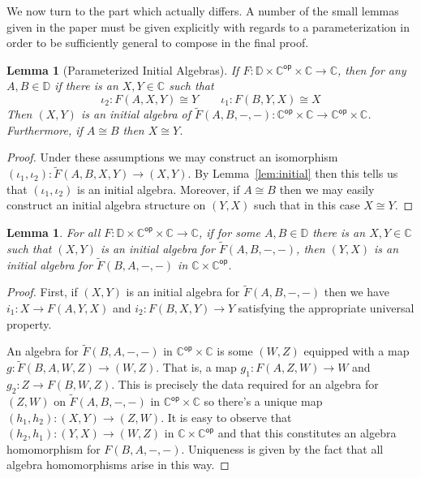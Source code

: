 \documentclass{amsart}
\newtheorem{lem}[thm]{Lemma}
\newcommand{\Ccat}{\ensuremath{\mathbb{C}}}
\newcommand{\Dcat}{\ensuremath{\mathbb{D}}}
\newcommand{\op}[1]{\ensuremath{#1^{\mathsf{op}}}}
\newcommand{\symmetrize}[1]{\ensuremath{\widetilde{#1}}}
\begin{document}
We now turn to the part which actually differs. A number of the small
lemmas given in the paper must be given explicitly with regards to a
parameterization in order to be sufficiently general to compose in the
final proof.
\begin{lem}[Parameterized Initial Algebras]\label{lem:parameterized-initial-algebra}
  If $F : \Dcat \times \op{\Ccat} \times \Ccat \to \Ccat$, then for
  any $A, B \in \Dcat$ if there is an $X, Y \in \Ccat$ such that
  \[
    \iota_2 : F(A, X, Y) \cong Y \qquad \iota_1 : F(B, Y, X) \cong X
  \]
  Then $(X, Y)$ is an initial algebra of
  $\symmetrize{F}(A, B, -, -) : \op{\Ccat} \times \Ccat \to \op{\Ccat}
  \times \Ccat$. Furthermore, if $A \cong B$ then $X \cong Y$.
\end{lem}
\begin{proof}
  Under these assumptions we may construct an isomorphism
  $(\iota_1, \iota_2) : \symmetrize{F}(A, B, X, Y) \to (X, Y)$. By
  Lemma~\ref{lem:initial} then this tells us that $(\iota_1, \iota_2)$
  is an initial algebra. Moreover, if $A \cong B$ then we may easily
  construct an initial algebra structure on $(Y, X)$ such that in this
  case $X \cong Y$.
\end{proof}
\begin{lem}\label{lem:flipped-initial-algebras}
  For all
  $F : \Dcat \times \op{\Ccat} \times \Ccat \to \Ccat$,
  if for some $A, B \in \Dcat$ there is an $X, Y \in \Ccat$ such that
  $(X, Y)$ is an initial algebra for $\symmetrize{F}(A, B, -, -)$, then
  $(Y, X)$ is an initial algebra for $\symmetrize{F}(B, A, -, -)$ in
  $\Ccat \times \op{\Ccat}$.
\end{lem}
\begin{proof}
  First, if $(X, Y)$ is an initial algebra for
  $\symmetrize{F}(A, B, -, -)$ then we have $i_1 : X \to F(A, Y, X)$
  and $i_2 : F(B, X, Y) \to Y$ satisfying the appropriate universal
  property.

  An algebra for $\symmetrize{F}(B, A, -, -)$ in
  $\op{\Ccat} \times \Ccat$ is some $(W, Z)$ equipped with a map
  $g : \symmetrize{F}(B, A, W, Z) \to (W, Z)$. That is, a map
  $g_1 : F(A, Z, W) \to W$ and $g_2 : Z \to F(B, W, Z)$. This is
  precisely the data required for an algebra for $(Z, W)$ on
  $\symmetrize{F}(A, B, -, -)$ in $\op{\Ccat} \times \Ccat$ so there's
  a unique map $(h_1, h_2) : (X, Y) \to (Z, W)$. It is easy to observe
  that $(h_2, h_1) : (Y, X) \to (W, Z)$ in $\Ccat \times \op{\Ccat}$
  and that this constitutes an algebra homomorphism for
  $F(B, A, -, -)$. Uniqueness is given by the fact that all algebra
  homomorphisms arise in this way.
\end{proof}
\end{document}

